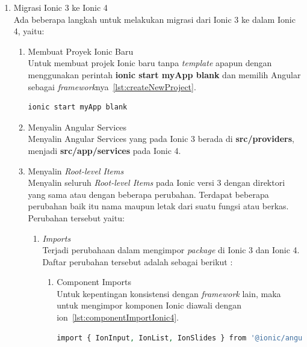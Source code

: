 \begin{enumerate}
	\item Migrasi Ionic 3 ke Ionic 4 \\
	Ada beberapa langkah untuk melakukan migrasi dari Ionic 3 ke dalam Ionic 4, yaitu:
	

	\begin{enumerate}
		\item Membuat Proyek Ionic Baru \\
		Untuk membuat projek Ionic baru tanpa {\it template} apapun dengan menggunakan perintah \textbf{ionic start myApp blank} dan memilih Angular sebagai {\it framework}nya~\ref{lst:createNewProject}.
		\begin{lstlisting}[language=php, label={lst:createNewProject}, caption=Perintah Membuat Proyek Ionic Baru]
ionic start myApp blank
		\end{lstlisting}

		\item Menyalin Angular Services \\
		Menyalin Angular Services yang pada Ionic 3 berada di \textbf{src/providers}, menjadi \textbf{src/app/services} pada Ionic 4.

		\item Menyalin {\it Root-level Items} \\
		Menyalin seluruh {\it Root-level Items} pada Ionic versi 3 dengan direktori yang sama atau dengan beberapa perubahan. Terdapat beberapa perubahan baik itu nama maupun letak dari suatu fungsi atau berkas. Perubahan tersebut yaitu:

		\begin{enumerate}
		
			\item {\it Imports} \\
			Terjadi perubahaan dalam mengimpor {\it package} di Ionic 3 dan Ionic 4. Daftar perubahan tersebut adalah sebagai berikut :
			\begin{enumerate}	
				\item Component Imports \\
				Untuk kepentingan konsistensi dengan {\it framework} lain, maka untuk mengimpor komponen Ionic diawali dengan ion~\ref{lst:componentImportIonic4}.
				\begin{lstlisting}[language=php, label={lst:componentImportIonic4}, caption=Impor Komponen pada Ionic 4]
import { IonInput, IonList, IonSlides } from '@ionic/angular';
				\end{lstlisting}


\end{enumerate}
\end{enumerate}
\end{enumerate}
\end{enumerate}
